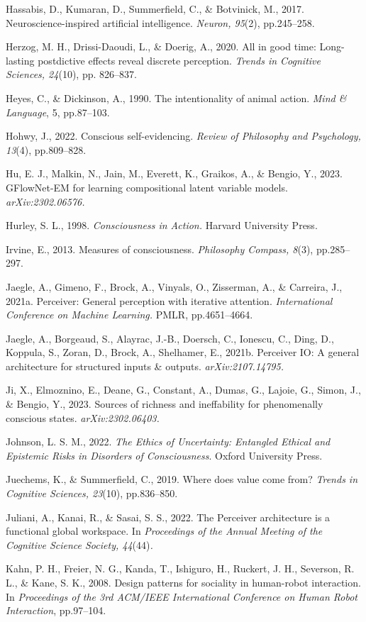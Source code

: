 \documentclass[12pt]{article}
\begin{document}
Hassabis, D., Kumaran, D., Summerfield, C., \& Botvinick, M., 2017.
Neuroscience-inspired artificial intelligence. \emph{Neuron, 95}(2),
pp.245--258.

Herzog, M. H., Drissi-Daoudi, L., \& Doerig, A., 2020. All in good time:
Long-lasting postdictive effects reveal discrete perception.
\emph{Trends in Cognitive Sciences, 24}(10), pp. 826--837.

Heyes, C., \& Dickinson, A., 1990. The intentionality of animal action.
\emph{Mind \& Language}, 5, pp.87--103.

Hohwy, J., 2022. Conscious self-evidencing. \emph{Review of Philosophy
and Psychology, 13}(4), pp.809--828.

Hu, E. J., Malkin, N., Jain, M., Everett, K., Graikos, A., \& Bengio,
Y., 2023. GFlowNet-EM for learning compositional latent variable models.
\emph{arXiv:2302.06576.}

Hurley, S. L., 1998. \emph{Consciousness in Action.} Harvard University
Press.

Irvine, E., 2013. Measures of consciousness. \emph{Philosophy Compass,
8}(3), pp.285--297.

Jaegle, A., Gimeno, F., Brock, A., Vinyals, O., Zisserman, A., \&
Carreira, J., 2021a. Perceiver: General perception with iterative
attention. \emph{International Conference on Machine Learning.} PMLR,
pp.4651--4664.

Jaegle, A., Borgeaud, S., Alayrac, J.-B., Doersch, C., Ionescu, C.,
Ding, D., Koppula, S., Zoran, D., Brock, A., Shelhamer, E., 2021b.
Perceiver IO: A general architecture for structured inputs \& outputs.
\emph{arXiv:2107.14795.}

Ji, X., Elmoznino, E., Deane, G., Constant, A., Dumas, G., Lajoie, G.,
Simon, J., \& Bengio, Y., 2023. Sources of richness and ineffability for
phenomenally conscious states. \emph{arXiv:2302.06403.}

Johnson, L. S. M., 2022. \emph{The Ethics of Uncertainty: Entangled
Ethical and Epistemic Risks in Disorders of Consciousness}. Oxford
University Press.

Juechems, K., \& Summerfield, C., 2019. Where does value come from?
\emph{Trends in Cognitive Sciences, 23}(10), pp.836--850.

Juliani, A., Kanai, R., \& Sasai, S. S., 2022. The Perceiver
architecture is a functional global workspace. In \emph{Proceedings of
the Annual Meeting of the Cognitive Science Society, 44}(44)\emph{.}

Kahn, P. H., Freier, N. G., Kanda, T., Ishiguro, H., Ruckert, J. H.,
Severson, R. L., \& Kane, S. K., 2008. Design patterns for sociality in
human-robot interaction. In \emph{Proceedings of the 3rd ACM/IEEE
International Conference on Human Robot Interaction}, pp.97--104.
\end{document}
